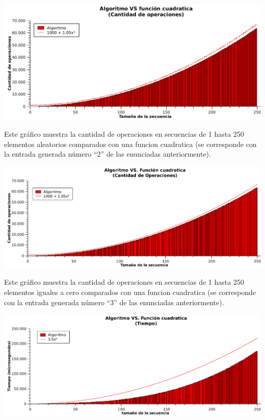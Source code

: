  \vspace*{1cm}
\hspace*{-2.1cm}\includegraphics[width=475pt]{../ej1/graficos/operaciones250.pdf}

Este gráfico muestra la cantidad de operaciones en secuencias de 1 hasta 250 elementos aleatorios comparados con una funcion cuadratica (se corresponde con la entrada generada número ``2'' de las enunciadas anteriormente).

 \vspace*{1cm}
\hspace*{-2.1cm}\includegraphics[width=475pt]{../ej1/graficos/operaciones0.pdf}

Este gráfico muestra la cantidad de operaciones en secuencias de 1 hasta 250 elementos iguales a cero comparados con una funcion cuadratica (se corresponde con la entrada generada número ``3'' de las enunciadas anteriormente).

 \vspace*{1cm}
\hspace*{-2.1cm}\includegraphics[width=475pt]{../ej1/graficos/tiempo0.pdf}


